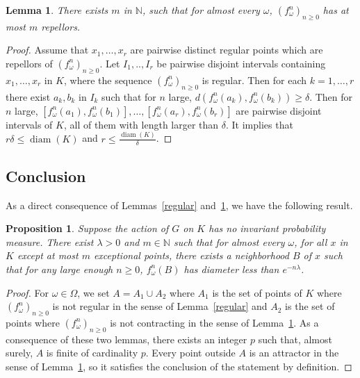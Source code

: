 \documentclass[10pt]{amsart}
\newtheorem{lemm}[theo]{Lemma}\newtheorem{prop}[theo]{Proposition}\newtheorem{coro}[theo]{Corollary}\newtheorem{conj}[theo]{Conjecture}
\theoremstyle{definition}\newtheorem{defi}[theo]{Definition}\newtheorem{rema}[theo]{Remark}\newtheorem{exam}[theo]{Example}\newtheorem{exem}[theo]{Example}\newtheorem{nota}[theo]{Notation}
\DeclareMathOperator{\diam}{diam}
\newcommand{\N}{\mathbb{N}}
\begin{document}
\begin{lemm}\label{repellors}
There exists $m$ in $\N$, such that for almost every $\omega$, $(f_\omega^n)_{n \geq 0}$ has at most $m$ repellors.
\end{lemm}
\begin{proof}
Assume that $x_1,\dots, x_r$ are pairwise distinct regular points which are repellors of $(f_\omega^n)_{n\geq 0}$. Let $I_1,..,I_r$ be pairwise disjoint intervals containing $x_1,\dots, x_r$ in $K$, where the sequence $(f_\omega^n)_{n \geq 0}$ is regular. Then for each $k=1,\dots,r$ there exist $a_k,b_k$ in $I_k$ such that for $n$ large, $d(f_\omega^n(a_k),f_\omega^n(b_k))\geq \delta$. Then for $n$ large, $[f_\omega^n(a_1),f_\omega^n(b_1)],\dots,[f_\omega^n(a_r),f_\omega^n(b_r)]$ are pairwise disjoint intervals of $K$, all of them with length larger than $\delta$. It implies that $r\delta\leq \diam(K)$ and $r \leq \frac{\diam(K)}{\delta}$.
\end{proof}


\subsection{Conclusion}

As a direct consequence of Lemmas~\ref{regular} and~\ref{repellors}, we have the following result.

\begin{prop}\label{semilocalcontr}
Suppose the action of $G$ on $K$ has no invariant probability measure. There exist $\lambda>0$ and $m\in \N$ such that for almost every $\omega$, for all $x$ in $K$ except at most $m$ exceptional points, there exists a neighborhood $B$ of $x$ such that for any large enough $n\geq 0$, $f_\omega^n(B)$ has diameter less than $e^{-n\lambda}$.
\end{prop}
\begin{proof}
For $\omega\in \Omega$, we set $A=A_1\cup A_2$ where $A_1$ is the set of points of $K$ where $(f_\omega^n)_{n \geq 0}$ is not regular in the sense of Lemma~\ref{regular} and $A_2$ is the set of points where $(f_\omega^n)_{n \geq 0}$ is not contracting in the sense of Lemma~\ref{repellors}. As a consequence of these two lemmas, there exists an integer $p$ such that, almost surely, $A$ is finite of cardinality $p$. Every point outside $A$ is an attractor in the sense of Lemma~\ref{repellors}, so it satisfies the conclusion of the statement by definition.
\end{proof}
\end{document}
